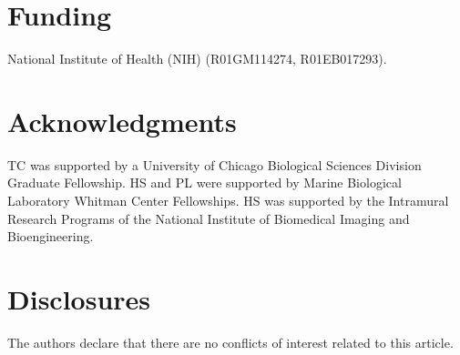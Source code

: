 \documentclass[10pt]{article}
\begin{document}
\section*{Funding}
National Institute of Health (NIH) (R01GM114274, R01EB017293).

\section*{Acknowledgments}
TC was supported by a University of Chicago Biological Sciences Division
Graduate Fellowship. HS and PL were supported by Marine Biological Laboratory
Whitman Center Fellowships. HS was supported by the Intramural Research
Programs of the National Institute of Biomedical Imaging and Bioengineering.

\section*{Disclosures}
The authors declare that there are no conflicts of interest related to this article.
\end{document}
